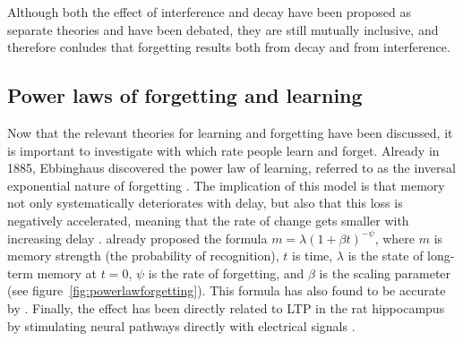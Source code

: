 Although both the effect of interference and decay have been proposed as separate theories and have been debated, they are still mutually inclusive, and  therefore conludes that forgetting results both from decay and from interference.

\subsection{Power laws of forgetting and learning}

Now that the relevant theories for learning and forgetting have been discussed, it is important to investigate with which rate people learn and forget. Already in 1885, Ebbinghaus discovered the power law of learning, referred to as the inversal exponential nature of forgetting \cite{microlearning, activationbasedmodel}. The implication of this model is that memory not only systematically deteriorates with delay, but also that this loss is negatively accelerated, meaning that the rate of change gets smaller with increasing delay \cite{cognitivepsychology}.  already proposed the formula $m = \lambda (1 + \beta t)^{-\psi}$, where $m$ is memory strength (the probability of recognition), $t$ is time, $\lambda$ is the state of long-term memory at $t = 0$, $\psi$ is the rate of forgetting, and $\beta$ is the scaling parameter (see figure~\ref{fig:powerlawforgetting}). This formula has also found to be accurate by . Finally, the effect has been directly related to LTP in the rat hippocampus by stimulating neural pathways directly with electrical signals \cite{raymond}.


